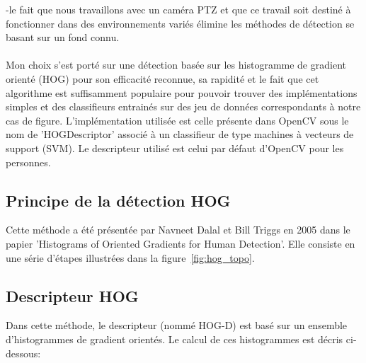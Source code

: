 \documentclass[11pt]{article}
\begin{document}
-le fait que nous travaillons avec un caméra PTZ et que ce travail soit destiné à fonctionner dans des environnements variés élimine les méthodes de détection se basant sur un fond connu.\\
\\
Mon choix s'est porté sur une détection basée sur les histogramme de gradient orienté (HOG) pour son efficacité reconnue, sa rapidité et le fait que cet algorithme est suffisamment populaire pour pouvoir trouver des implémentations simples et des classifieurs entrainés sur des jeu de données correspondants à notre cas de figure.
L’implémentation utilisée est celle présente dans OpenCV sous le nom de 'HOGDescriptor' associé à un classifieur de type machines à vecteurs de support (SVM). Le descripteur utilisé est celui par défaut d'OpenCV pour les personnes.
\subsection{Principe de la détection HOG}
Cette méthode a été présentée par Navneet Dalal et Bill Triggs en 2005 dans le papier 'Histograms of Oriented Gradients for Human Detection'.
Elle consiste en une série d'étapes illustrées dans la figure~\ref{fig:hog_topo}.

\subsection{Descripteur HOG}
Dans cette méthode, le descripteur (nommé HOG-D) est basé sur un ensemble d'histogrammes de gradient orientés. Le calcul de ces histogrammes est décris ci-dessous:
\end{document}
